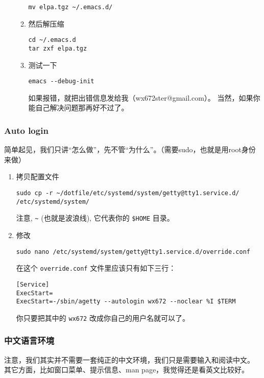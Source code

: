 \documentclass{wx672ctexart}
\begin{document}
\begin{enumerate}
\begin{enumerate}
\begin{verbatim}
mv elpa.tgz ~/.emacs.d/
\end{verbatim}
\item 然后解压缩
\begin{verbatim}
cd ~/.emacs.d
tar zxf elpa.tgz
\end{verbatim}
\item 测试一下
\begin{verbatim}
emacs --debug-init
\end{verbatim}
如果报错，就把出错信息发给我（wx672ster@gmail.com）。  
当然，如果你能自己解决问题那再好不过了。
\end{enumerate}
\end{enumerate}
\subsubsection{Auto login}
\label{sec:orge980901}
简单起见，我们只讲“怎么做”，先不管“为什么”。（需要sudo，也就是用root身份来做）
\begin{enumerate}
\item 拷贝配置文件
\begin{verbatim}
sudo cp -r ~/dotfile/etc/systemd/system/getty@tty1.service.d/ /etc/systemd/system/
\end{verbatim}
注意, \texttt{\textasciitilde{}} (也就是波浪线), 它代表你的 \texttt{\$HOME} 目录。
\item 修改
\begin{verbatim}
sudo nano /etc/systemd/system/getty@tty1.service.d/override.conf
\end{verbatim}
在这个 \texttt{override.conf} 文件里应该只有如下三行：
\begin{verbatim}
[Service]
ExecStart=
ExecStart=-/sbin/agetty --autologin wx672 --noclear %I $TERM
\end{verbatim}
你只要把其中的 \texttt{wx672} 改成你自己的用户名就可以了。
\end{enumerate}

\subsubsection{中文语言环境}
\label{sec:org3fbebb1}
注意，我们其实并不需要一套纯正的中文环境，我们只是需要输入和阅读中文。
其它方面，比如窗口菜单、提示信息、man page，我觉得还是看英文比较好。
\end{document}
